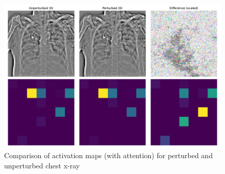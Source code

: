 \begin{figure}[h]
    \centering
    \includegraphics[width=\linewidth]{graphics/ResNet-50/pneumo_with_attention.pdf}
    \caption{Comparison of activation maps (with attention) for perturbed and unperturbed chest x-ray}
    \label{PneumoWithAttention}
  \end{figure}